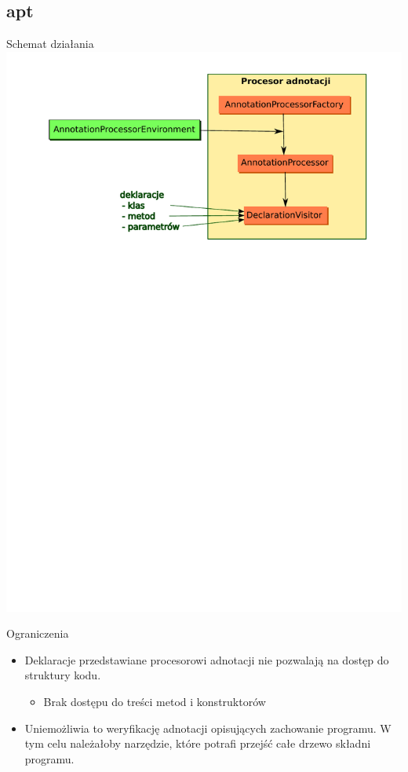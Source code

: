 \documentclass{beamer}
\begin{document}
\subsection{apt}

\begin{frame}{Schemat działania}
  \includegraphics[scale=0.55]{img/apt.pdf}
\end{frame}

\begin{frame}{Ograniczenia}
  \begin{itemize}
  \item Deklaracje przedstawiane procesorowi adnotacji 
    nie pozwalają na dostęp do struktury kodu.
    \begin{itemize}
    \item Brak dostępu do treści metod i konstruktorów
    \end{itemize}
  \item Uniemożliwia to weryfikację adnotacji opisujących zachowanie
    programu. W tym celu należałoby 
    narzędzie, które potrafi przejść całe drzewo składni programu.
  \end{itemize}
\end{frame}
    
\end{document}
